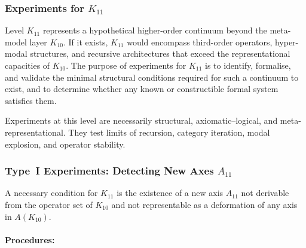 
\subsubsection{Experiments for $K_{11}$}
\label{sec:experiments-k11}

Level $K_{11}$ represents a hypothetical higher-order continuum
beyond the meta-model layer $K_{10}$.
If it exists, $K_{11}$ would encompass third-order operators,
hyper-modal structures, and recursive architectures that exceed the
representational capacities of $K_{10}$.
The purpose of experiments for $K_{11}$ is to identify, formalise,
and validate the minimal structural conditions required for such a
continuum to exist, and to determine whether any known or constructible
formal system satisfies them.

Experiments at this level are necessarily structural,
axiomatic–logical, and meta-representational.
They test limits of recursion, category iteration, modal explosion,
and operator stability.



\subsubsection{Type~I Experiments: Detecting New Axes $A_{11}$}

A necessary condition for $K_{11}$ is the existence of a new axis
$A_{11}$ not derivable from the operator set of $K_{10}$ and not
representable as a deformation of any axis in $A(K_{10})$.

\paragraph{Procedures:}


